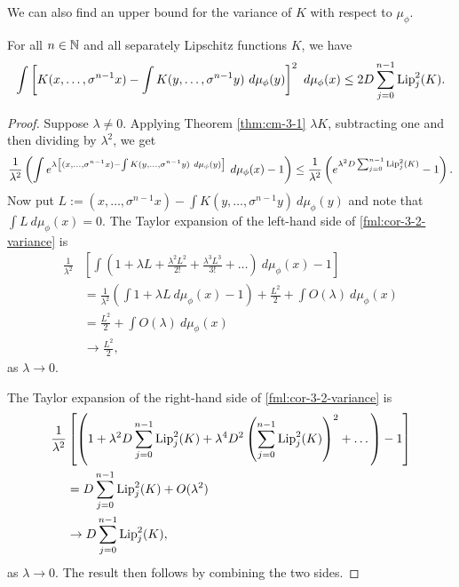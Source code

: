 We can also find an upper bound for the variance of $K$ with respect to $\mu_\phi$.

\begin{corollary}
	For all $n \in \mathbb{N}$ and all separately Lipschitz functions $K$, we have
	\[
		\int{\left[K(x, \dots, \sigma^{n - 1}{x}) - \int{K(y, \dots, \sigma^{n - 1}{y})\ d\mu_\phi(y)}\right]^2\ d\mu_\phi(x)} \leq 2D\sum_{j = 0}^{n - 1}{\Lip_j^2(K)}.
	\]
	
	\begin{proof}
		Suppose $\lambda \neq 0$. Applying Theorem \ref{thm:cm-3-1} $\lambda K$, subtracting one and then dividing by $\lambda^2$, we get
		\begin{equation} \label{fml:cor-3-2-variance}
			\frac{1}{\lambda^2}\left(\int{e^{\lambda\left[(x, \dots, \sigma^{n - 1}{x}) - \int{K(y, \dots, \sigma^{n - 1}{y})\ d\mu_\phi(y)}\right]}\ d\mu_\phi(x)} - 1\right) \leq \frac{1}{\lambda^2}\left(e^{\lambda^2 D \sum_{j = 0}^{n - 1}{\Lip_j^2(K)}} - 1\right).
		\end{equation}
		Now put $L := (x, \dots, \sigma^{n - 1}{x}) - \int{K(y, \dots, \sigma^{n - 1}{y})\ d\mu_\phi(y)}$ and note that $\int{L\ d\mu_\phi(x)} = 0$. The Taylor expansion of the left-hand side of \eqref{fml:cor-3-2-variance} is
		\begin{align*}
			\frac{1}{\lambda^2}&\left[\int{\left(1 + \lambda L + \frac{\lambda^2 L^2}{2!} + \frac{\lambda^3 L^3}{3!} + \dots\right)\ d\mu_\phi(x)} - 1\right] \\
				&= \frac{1}{\lambda^2}\left(\int{1 + \lambda L\ d\mu_\phi(x)} - 1\right) + \frac{L^2}{2} + \int{O(\lambda)\ d\mu_\phi(x)} \\
				&= \frac{L^2}{2} + \int{O(\lambda)\ d\mu_\phi(x)} \\
				&\to \frac{L^2}{2},
		\end{align*}
		as $\lambda \to 0$.
		
		The Taylor expansion of the right-hand side of \eqref{fml:cor-3-2-variance} is
		\begin{align*}
			\frac{1}{\lambda^2}&\left[\left(1 + \lambda^2 D \sum_{j = 0}^{n - 1}{\operatorname{Lip}_j^2(K)} + \lambda^4 D^2 \left(\sum_{j = 0}^{n - 1}{\operatorname{Lip}_j^2(K)} \right)^2 + \dots\right) - 1 \right] \\
				&= D \sum_{j = 0}^{n - 1}{\operatorname{Lip}_j^2(K)} + O(\lambda^2) \\
				&\to D \sum_{j = 0}^{n - 1}{\operatorname{Lip}_j^2(K)},
		\end{align*}
		as $\lambda \to 0$. The result then follows by combining the two sides.
	\end{proof}
\end{corollary}


